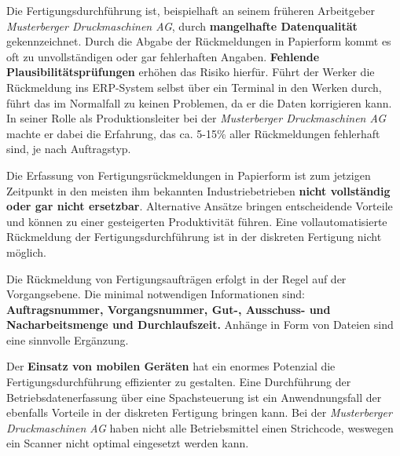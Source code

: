 \begin{definitionForm}[KA-B-4]
Die Fertigungsdurchführung ist, beispielhaft an seinem früheren Arbeitgeber \textit{Musterberger Druckmaschinen AG}, durch \textbf{mangelhafte Datenqualität} gekennzeichnet. Durch die Abgabe der Rückmeldungen in Papierform kommt es oft zu unvollständigen oder gar fehlerhaften Angaben. \textbf{Fehlende Plausibilitätsprüfungen} erhöhen das Risiko hierfür. Führt der Werker die Rückmeldung ins ERP-System selbst über ein Terminal in den Werken durch, führt das im Normalfall zu keinen Problemen, da er die Daten korrigieren kann. In seiner Rolle als Produktionsleiter bei der \textit{Musterberger Druckmaschinen AG} machte er dabei die Erfahrung, das ca. 5-15\% aller Rückmeldungen fehlerhaft sind, je nach Auftragstyp.
\end{definitionForm}

\begin{definitionForm}[KA-B-5]
Die Erfassung von Fertigungsrückmeldungen in Papierform ist zum jetzigen Zeitpunkt in den meisten ihm bekannten Industriebetrieben \textbf{nicht vollständig oder gar nicht ersetzbar}. Alternative Ansätze bringen entscheidende Vorteile und können zu einer gesteigerten Produktivität führen. Eine vollautomatisierte Rückmeldung der Fertigungsdurchführung ist in der diskreten Fertigung nicht möglich.
\end{definitionForm}

\begin{definitionForm}[KA-B-6]
Die Rückmeldung von Fertigungsaufträgen erfolgt in der Regel auf der Vorgangsebene. Die minimal notwendigen Informationen sind: \textbf{Auftragsnummer, Vorgangsnummer, Gut-, Ausschuss- und Nacharbeitsmenge und Durchlaufszeit.}
Anhänge in Form von Dateien sind eine sinnvolle Ergänzung.
\end{definitionForm}

\begin{definitionForm}[KA-B-7]
Der \textbf{Einsatz von mobilen Geräten} hat ein enormes Potenzial die Fertigungsdurchführung effizienter zu gestalten. Eine Durchführung der Betriebsdatenerfassung über eine Spachsteuerung ist ein Anwendnungsfall der ebenfalls Vorteile in der diskreten Fertigung bringen kann. Bei der \textit{Musterberger Druckmaschinen AG} haben nicht alle Betriebsmittel einen Strichcode, weswegen ein Scanner nicht optimal eingesetzt werden kann.
\end{definitionForm}